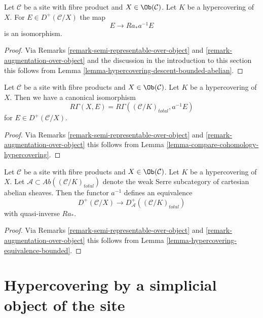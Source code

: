 \begin{lemma}
\label{lemma-hypercovering-X-descent-bounded-abelian}
Let $\mathcal{C}$ be a site with fibre product and $X \in \Ob(\mathcal{C})$.
Let $K$ be a hypercovering of $X$. For
$E \in D^+(\mathcal{C}/X)$ the map
$$
E \longrightarrow Ra_*a^{-1}E
$$
is an isomorphism.
\end{lemma}

\begin{proof}
Via Remarks \ref{remark-semi-representable-over-object} and
\ref{remark-augmentation-over-object} and the discussion in
the introduction to this section
this follows from Lemma \ref{lemma-hypercovering-descent-bounded-abelian}.
\end{proof}

\begin{lemma}
\label{lemma-compare-cohomology-hypercovering-X}
Let $\mathcal{C}$ be a site with fibre products and $X \in \Ob(\mathcal{C})$.
Let $K$ be a hypercovering of $X$.
Then we have a canonical isomorphism
$$
R\Gamma(X, E) = R\Gamma((\mathcal{C}/K)_{total}, a^{-1}E)
$$
for $E \in D^+(\mathcal{C}/X)$.
\end{lemma}

\begin{proof}
Via Remarks \ref{remark-semi-representable-over-object} and
\ref{remark-augmentation-over-object}
this follows from Lemma \ref{lemma-compare-cohomology-hypercovering}.
\end{proof}

\begin{lemma}
\label{lemma-hypercovering-X-equivalence-bounded}
Let $\mathcal{C}$ be a site with fibre products and $X \in \Ob(\mathcal{C})$.
Let $K$ be a hypercovering of $X$.
Let $\mathcal{A} \subset \textit{Ab}((\mathcal{C}/K)_{total})$
denote the weak Serre subcategory of cartesian abelian sheaves.
Then the functor $a^{-1}$ defines an equivalence
$$
D^+(\mathcal{C}/X) \longrightarrow D_\mathcal{A}^+((\mathcal{C}/K)_{total})
$$
with quasi-inverse $Ra_*$.
\end{lemma}

\begin{proof}
Via Remarks \ref{remark-semi-representable-over-object} and
\ref{remark-augmentation-over-object}
this follows from Lemma \ref{lemma-hypercovering-equivalence-bounded}.
\end{proof}






\section{Hypercovering by a simplicial object of the site}
\label{section-hypercovering}

